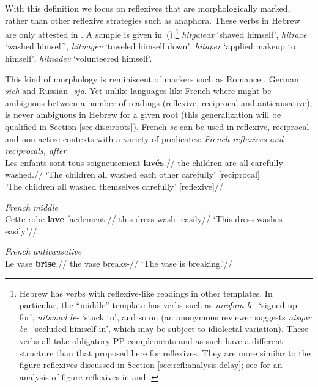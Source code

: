 With this definition we focus on reflexives that are morphologically marked, rather than other reflexive strategies such as anaphora. These verbs in Hebrew are only attested in \thit. A sample is given in~(\nextx).\footnote{Hebrew has verbs with reflexive-like readings in other templates. In particular, the ``middle'' template {\tnif} has verbs such as \emph{nirsʃam le-} `signed up for', \emph{nitsmad le-} `stuck to', and so on (an anonymous reviewer suggests \emph{nisgar be-} `secluded himself in', which may be subject to idiolectal variation). These verbs all take obligatory PP complements and as such have a different structure than that proposed here for reflexives. They are more similar to the figure reflexives discussed in Section \ref{sec:refl:analysis:delay}; see \citet[Chapter~2.2]{kastner16phd} for an analysis of figure reflexives in {\tnif} and {\thit}.}
\ex\label{ex:refl}\emph{hitgaleax} `shaved himself', \emph{hitraxe\texttslig} `washed himself', \emph{hitnagev} `toweled himself down', \emph{hitaper} `applied makeup to himself', \emph{hitnadev} `volunteered himself'.
\xe

This kind of morphology is reminiscent of markers such as Romance , German \emph{sich} and Russian \emph{-sja}. Yet unlike languages like French where  might be ambiguous between a number of readings (reflexive, reciprocal and anticausative), {\thit} is never ambiguous in Hebrew for a given root (this generalization will be qualified in Section \ref{sec:disc:roots}). French \emph{se} can be used in reflexive, reciprocal and non-active contexts with a variety of predicates:
\pex
	\a \textit{French reflexives and reciprocals, after} \citet[839]{labelle08}\\
	\begingl
	\gla Les enfants  sont tous soigneusement \textbf{lav\'es}.//
	\glb the children  are all carefully washed.//
	\glft `The children all washed each other carefully' \hfill [reciprocal]\\
	`The children all washed themselves carefully' \hfill [reflexive]//
	\endgl

	\a \textit{French middle} \citep[835]{labelle08}\\
	\begingl
	\gla Cette robe  \textbf{lave} facilement.//
	\glb this dress  wash- easily//
	\glft `This dress washes easily.'//
	\endgl
	
	\a \textit{French anticausative} \citep[835]{labelle08}\\
	\begingl
	\gla Le vase  \textbf{brise}.//
	\glb the vase  breaks-//
	\glft `The vase is breaking.'//
	\endgl
\xe

